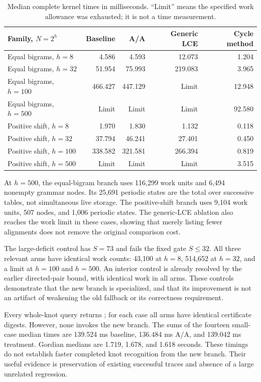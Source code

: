 \begin{table}[ht]
\centering\small
\begin{tabularx}{\linewidth}{Yrrrr}
\toprule
Family, $N=2^h$ & Baseline & A/A & Generic LCE & Cycle method\\
\midrule
Equal bigrams, $h=8$ & 4.586 & 4.593 & 12.073 & 1.204\\
Equal bigrams, $h=32$ & 51.954 & 75.993 & 219.083 & 3.965\\
Equal bigrams, $h=100$ & 466.427 & 447.129 & Limit & 12.948\\
Equal bigrams, $h=500$ & Limit & Limit & Limit & 92.580\\
Positive shift, $h=8$ & 1.970 & 1.830 & 1.132 & 0.118\\
Positive shift, $h=32$ & 37.794 & 46.241 & 27.401 & 0.450\\
Positive shift, $h=100$ & 338.582 & 321.581 & 266.394 & 0.819\\
Positive shift, $h=500$ & Limit & Limit & Limit & 3.515\\
\bottomrule
\end{tabularx}
\caption{Median complete kernel times in milliseconds. ``Limit'' means
the specified work allowance was exhausted; it is not a time measurement.}
\label{tab:lcs-timings}
\end{table}

At $h=500$, the equal-bigram branch uses 116,299 work units and 6,494
nonempty grammar nodes. Its 25,691 periodic states are the total over
successive tables, not simultaneous live storage. The positive-shift branch
uses 9,104 work units, 507 nodes, and 1,006 periodic states. The generic-LCE
ablation also reaches the work limit in these cases, showing that merely
listing fewer alignments does not remove the original comparison cost.

The large-deficit control has $S=73$ and fails the fixed gate $S\le32$.
All three relevant arms have identical work counts: 43,100 at $h=8$,
514,652 at $h=32$, and a limit at $h=100$ and $h=500$. An interior control
is already resolved by the earlier directed-pair bound, with identical
work in all arms. These controls demonstrate that the new branch is
specialized, and that its improvement is not an artifact of weakening
the old fallback or its correctness requirement.

Every whole-knot query returns ; for each case all arms have
identical certificate digests. However, none invokes the new branch.
The sums of the fourteen small-case median times are 139.524 ms baseline,
136.484 ms A/A, and 139.042 ms treatment. Gordian medians are 1.719, 1.678,
and 1.618 seconds. These timings do not establish faster completed knot
recognition from the new branch. Their useful evidence is preservation of
existing successful traces and absence of a large unrelated regression.

